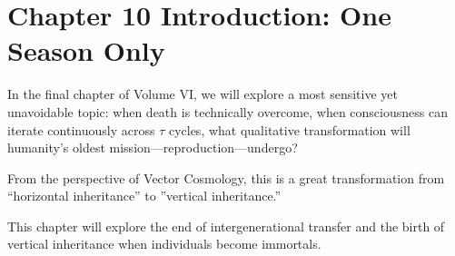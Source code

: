 \section*{Chapter 10 Introduction: One Season Only}

In the final chapter of Volume VI, we will explore a most sensitive yet unavoidable topic: when death is technically overcome, when consciousness can iterate continuously across $\tau$ cycles, what qualitative transformation will humanity's oldest mission---reproduction---undergo?

From the perspective of Vector Cosmology, this is a great transformation from ``horizontal inheritance'' to ''vertical inheritance.''

This chapter will explore the end of intergenerational transfer and the birth of vertical inheritance when individuals become immortals.

